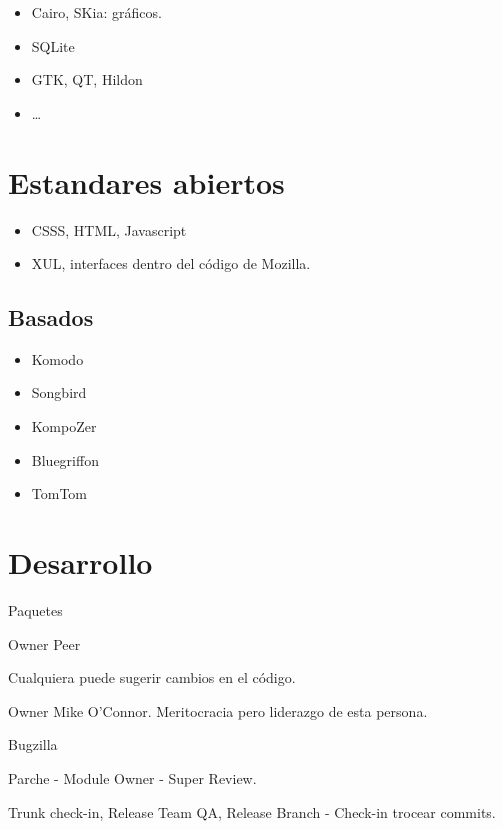 \documentclass[11pt]{scrartcl}
\begin{document}
\begin{itemize}
	\item Cairo, SKia: gr\'aficos.
	\item SQLite
	\item GTK, QT, Hildon
	\item \ldots
\end{itemize}


\section{Estandares abiertos}
\label{sec:open-standards}

\begin{itemize}
	\item  CSSS, HTML, Javascript
	\item XUL, interfaces dentro del c\'odigo de Mozilla.
\end{itemize}


\subsection{Basados}
\label{sub:mozilla-based}

\begin{itemize}
	\item Komodo
	\item Songbird
	\item KompoZer
	\item Bluegriffon
	\item TomTom
\end{itemize}


\section{Desarrollo}
\label{sec:}

Paquetes

Owner
Peer

Cualquiera puede sugerir cambios en el c\'odigo.

Owner Mike O'Connor. Meritocracia pero liderazgo de esta persona.

Bugzilla

Parche - Module Owner - Super Review.

Trunk check-in, Release Team QA, Release Branch  - Check-in trocear commits.
\end{document}
